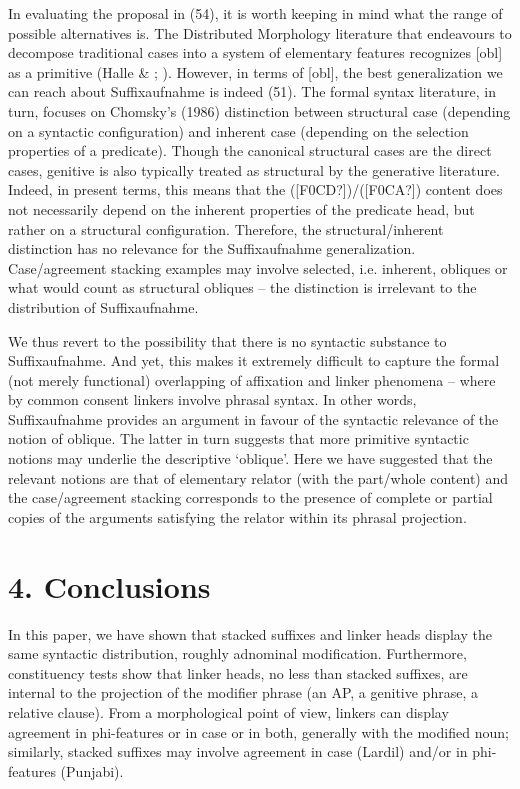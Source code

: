 \documentclass[output=paper]{langsci/langscibook}
\begin{document}
In evaluating the proposal in (54), it is worth keeping in mind what the range of possible alternatives is. The Distributed Morphology literature that endeavours to decompose traditional cases into a system of elementary features recognizes [obl] as a primitive (Halle \& \citealt{Vaux1998}; \citealt{Calabrese2008}). However, in terms of [obl], the best generalization we can reach about Suffixaufnahme is indeed (51). The formal syntax literature, in turn, focuses on Chomsky’s (1986) distinction between structural case (depending on a syntactic configuration) and inherent case (depending on the selection properties of a predicate). Though the canonical structural cases are the direct cases, genitive is also typically treated as structural by the generative literature. Indeed, in present terms, this means that the ([F0CD?])/([F0CA?]) content does not necessarily depend on the inherent properties of the predicate head, but rather on a structural configuration. Therefore, the structural/inherent distinction has no relevance for the Suffixaufnahme generalization. Case/agreement stacking examples may involve selected, i.e. inherent, obliques or what would count as structural obliques  – the distinction is irrelevant to the distribution of Suffixaufnahme. 

We thus revert to the possibility that there is no syntactic substance to Suffixaufnahme. And yet, this makes it extremely difficult to capture the formal (not merely functional) overlapping of affixation and linker phenomena – where by common consent linkers involve phrasal syntax. In other words, Suffixaufnahme provides an argument in favour of the syntactic relevance of the notion of oblique. The latter in turn suggests that more primitive syntactic notions may underlie the descriptive ‘oblique’. Here we have suggested that the relevant notions are that of elementary relator (with the part/whole content) and the case/agreement stacking corresponds to the presence of complete or partial copies of the arguments satisfying the relator within its phrasal projection. 

\section{ 4. Conclusions} 

In this paper, we have shown that stacked suffixes and linker heads display the same syntactic distribution, roughly adnominal modification. Furthermore, constituency tests show that linker heads, no less than stacked suffixes, are internal to the projection of the modifier phrase (an AP, a genitive phrase, a relative clause). From a morphological point of view, linkers can display agreement in phi-features or in case or in both, generally with the modified noun; similarly, stacked suffixes may involve agreement in case (Lardil) and/or in phi-features (Punjabi). 
\end{document}
